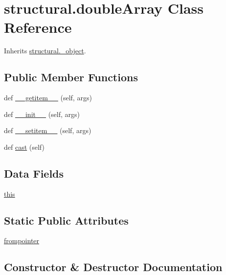\hypertarget{classstructural_1_1double_array}{}\section{structural.\+double\+Array Class Reference}
\label{classstructural_1_1double_array}


Inherits \hyperlink{classstructural_1_1__object}{structural.\+\_\+object}.

\subsection*{Public Member Functions}
\begin{DoxyCompactItemize}
\item 
def \hyperlink{classstructural_1_1double_array_a3039198822e26a3d86fb3eb0d43275e2}{\+\_\+\+\_\+getitem\+\_\+\+\_\+} (self, args)
\item 
def \hyperlink{classstructural_1_1double_array_a6b069aab64b9bf86ee6cd484abe1d9c5}{\+\_\+\+\_\+init\+\_\+\+\_\+} (self, args)
\item 
def \hyperlink{classstructural_1_1double_array_a65035e48ad0ede21cb47b4c199ed161c}{\+\_\+\+\_\+setitem\+\_\+\+\_\+} (self, args)
\item 
def \hyperlink{classstructural_1_1double_array_a58bf83ce4d43160cfa23907905aeb57c}{cast} (self)
\end{DoxyCompactItemize}
\subsection*{Data Fields}
\begin{DoxyCompactItemize}
\item 
\hyperlink{classstructural_1_1double_array_a489d8c52a9cc55e6bc5ee5d7410d4515}{this}
\end{DoxyCompactItemize}
\subsection*{Static Public Attributes}
\begin{DoxyCompactItemize}
\item 
\hyperlink{classstructural_1_1double_array_a0b8881002c866a04480bdbdab28d6841}{frompointer}
\end{DoxyCompactItemize}


\subsection{Constructor \& Destructor Documentation}
\mbox{\label{classstructural_1_1double_array_a6b069aab64b9bf86ee6cd484abe1d9c5}} 

